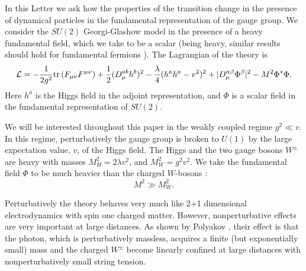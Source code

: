 \documentclass[a4paper,aps,prd,superscriptaddress,showpacs,showkeys]{revtex4}
\begin{document}
In this Letter we ask how the properties of the transition change in the
presence of  dynamical particles in the fundamental representation of the
gauge group. We consider the $SU(2)$ Georgi-Glashow model in the
presence of a heavy fundamental field, which we take to be a scalar
(being heavy, similar results should hold for fundamental fermions 
\cite{note}). The
Lagrangian of the theory is
\begin{eqnarray}
{\mathcal L}= -{1\over 2g^2} \mbox{tr}\left(F_{\mu \nu}F^{\mu
\nu}\right)
+ {1\over 2}(D^{ab}_\mu h^b)^2 -{\lambda
\over  4}(h^a h^a - v^2)^2
+|D^{\alpha\beta}_\mu \Phi^\beta|^2 -M^2\Phi^*\Phi .
\label{model1}
\end{eqnarray}
Here $h^a$ is the Higgs field in the adjoint representation, and $\Phi$
is
a  scalar field in the fundamental representation of $SU(2)$.

We will be interested throughout this paper in the weakly coupled
regime $g^2 \ll v$.
In this regime, perturbatively the gauge group is
broken to $U(1)$ by the large expectation value, $v$, of the Higgs field.
The Higgs and the two gauge bosons $W^\pm$ are heavy with masses $
M^2_H= 2\lambda v^2$, and $M^2_W=g^2v^2$.
We take the fundamental field $\Phi$ to be much heavier than the
charged $W$-bosons :
\begin{equation}
M^2\gg M^2_W.
\end{equation}

Perturbatively the theory behaves very much like 2+1 dimensional
electrodynamics with spin one charged matter.
However, nonperturbative effects are very important at large
distances. As shown by Polyakov \cite{Polyakov}, their effect is that the
photon, which is perturbatively massless, acquires a finite (but
exponentially small) mass and the charged $W^\pm$ become linearly
confined
at large distances with nonperturbatively small string tension.
\end{document}
